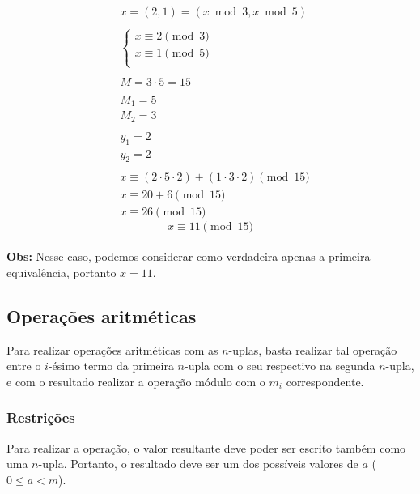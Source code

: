 \begin{align*}
     & x = (2,1) = (x \bmod 3, x \bmod 5)                            \\
    \\
     & \begin{cases}
           x \equiv 2 \pmod 3 \\
           x \equiv 1 \pmod 5 \\
       \end{cases}                                            \\
    \\
     & M = 3 \cdot 5 = 15                                            \\
    \\
     & M_1 = 5                                                       \\
     & M_2 = 3                                                       \\
    \\
     & y_1 = 2                                                       \\
     & y_2 = 2                                                       \\
    \\
     & x \equiv (2 \cdot 5 \cdot 2) + (1 \cdot 3 \cdot 2) \pmod {15} \\
     & x \equiv 20 + 6 \pmod {15}                                    \\
     & x \equiv 26 \pmod {15}
\end{align*}
\[
    \boxed{x \equiv 11 \pmod {15}}
\]\\
\textbf{Obs:} Nesse caso, podemos considerar como verdadeira apenas a primeira equivalência, portanto $x = 11$.

\subsection{Operações aritméticas}
Para realizar operações aritméticas com as $n$-uplas, basta realizar tal operação entre o $i$-ésimo termo da primeira $n$-upla com o seu respectivo na segunda $n$-upla, e com o resultado realizar a operação módulo com o $m_i$ correspondente.

\subsubsection*{Restrições}
Para realizar a operação, o valor resultante deve poder ser escrito também como uma $n$-upla. Portanto, o resultado deve ser um dos possíveis valores de $a$ ($0 \leq a < m$).

